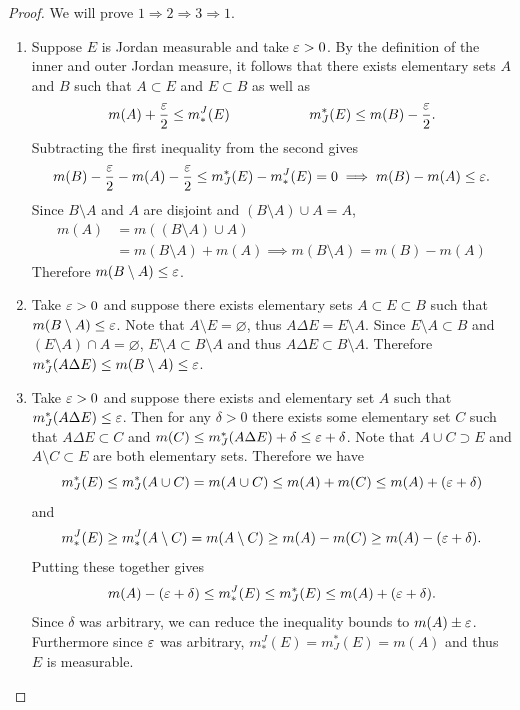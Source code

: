 \documentclass[hw_all.tex]{subfiles}
\begin{document}
\begin{proof}
    We will prove $1 \Rightarrow 2 \Rightarrow 3 \Rightarrow 1$. \hfill
    \begin{enumerate}
        \item[$1 \Rightarrow 2)$]
            Suppose $E$ is Jordan measurable and take $\varepsilon > 0$. By the definition of the inner and outer Jordan measure, it follows that there exists elementary sets $A$ and $B$ such that $A \subset E$ and $E \subset B$ as well as
            \[
                m(A) + \frac{\varepsilon}{2} \leq m_*^J(E) \hspace{2cm} m_J^*(E) \leq m(B) - \frac{\varepsilon}{2}
            .\]
            Subtracting the first inequality from the second gives
            \[
                m(B) - \frac{\varepsilon}{2} - m(A) - \frac{\varepsilon}{2} \leq m_J^*(E) - m^J_*(E) = 0 \implies m(B) - m(A) \leq \varepsilon
            .\]
            Since $B \setminus A$ and $A$ are disjoint and $(B \setminus A) \cup A = A$,
            \begin{align*}
                m(A) &= m((B \setminus A) \cup A) \\ 
                     &= m(B \setminus A) + m(A) \implies m(B \setminus A) = m(B) - m(A)
            \end{align*}
            Therefore $m(B \setminus A) \leq \varepsilon$.

        \item[$2 \Rightarrow 3)$]
            Take $\varepsilon > 0$ and suppose there exists elementary sets $A \subset E \subset B$ such that $m(B \setminus A) \leq \varepsilon$. Note that $A \setminus E = \varnothing$, thus $A \Delta E = E \setminus A$. Since $E \setminus A \subset B$ and $(E \setminus A) \cap A = \varnothing$, $E \setminus A \subset B \setminus A$ and thus $A \Delta E \subset B \setminus A$. Therefore $m_J^*(A \Delta E) \leq m(B \setminus A) \leq \varepsilon$.

        \item[$3 \Rightarrow 1)$]
            Take $\varepsilon > 0$ and suppose there exists and elementary set $A$ such that $m_J^*(A \Delta E) \leq \varepsilon$. Then for any $\delta > 0$ there exists some elementary set $C$ such that $A \Delta E \subset C$ and $m(C) \leq m_J^*(A \Delta E) + \delta \leq \varepsilon + \delta$. Note that $A \cup C \supset E$ and $A \setminus C \subset E$ are both elementary sets. Therefore we have
            \[
                m_J^*(E) \leq m_J^*(A \cup C) = m(A \cup C) \leq m(A) + m(C) \leq m(A) + (\varepsilon + \delta)
            \]
            and
            \[
                m^J_*(E) \geq m^J_*(A \setminus C) = m(A \setminus C) \geq m(A) - m(C) \geq m(A) - (\varepsilon + \delta)
            .\]
            Putting these together gives
            \[
                m(A) - (\varepsilon + \delta) \leq m^J_*(E) \leq m_J^*(E) \leq m(A) + (\varepsilon + \delta)
            .\]
            Since $\delta$ was arbitrary, we can reduce the inequality bounds to $m(A) \pm \varepsilon$. Furthermore since $\varepsilon$ was arbitrary, $m^J_*(E) = m_J^*(E) = m(A)$ and thus $E$ is measurable.
    \end{enumerate}
\end{proof}
\end{document}
